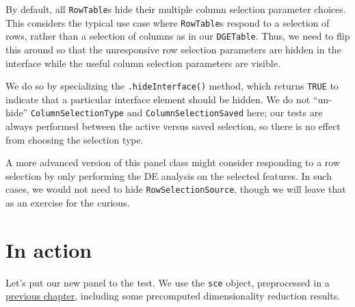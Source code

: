 \documentclass[]{book}
\newenvironment{Shaded}{\begin{snugshade}}{\end{snugshade}}
\newcommand{\KeywordTok}[1]{\textcolor[rgb]{0.13,0.29,0.53}{\textbf{#1}}}
\newcommand{\StringTok}[1]{\textcolor[rgb]{0.31,0.60,0.02}{#1}}
\newcommand{\OtherTok}[1]{\textcolor[rgb]{0.56,0.35,0.01}{#1}}
\newcommand{\ControlFlowTok}[1]{\textcolor[rgb]{0.13,0.29,0.53}{\textbf{#1}}}
\newcommand{\OperatorTok}[1]{\textcolor[rgb]{0.81,0.36,0.00}{\textbf{#1}}}
\newcommand{\NormalTok}[1]{#1}
\begin{document}
By default, all \texttt{RowTable}s hide their multiple column selection
parameter choices. This considers the typical use case where
\texttt{RowTable}s respond to a selection of rows, rather than a
selection of columns as in our \texttt{DGETable}. Thus, we need to flip
this around so that the unresponsive row selection parameters are hidden
in the interface while the useful column selection parameters are
visible.

We do so by specializing the \texttt{.hideInterface()} method, which
returns \texttt{TRUE} to indicate that a particular interface element
should be hidden. We do not ``un-hide'' \texttt{ColumnSelectionType} and
\texttt{ColumnSelectionSaved} here; our tests are always performed
between the active versus saved selection, so there is no effect from
choosing the selection type.

\begin{Shaded}
\end{Shaded}

A more advanced version of this panel class might consider responding to
a row selection by only performing the DE analysis on the selected
features. In such cases, we would not need to hide
\texttt{RowSelectionSource}, though we will leave that as an exercise
for the curious.

\section{In action}\label{in-action-1}

Let's put our new panel to the test. We use the \texttt{sce} object,
preprocessed in a \protect\hyperlink{developing}{previous chapter},
including some precomputed dimensionality reduction results.
\end{document}
